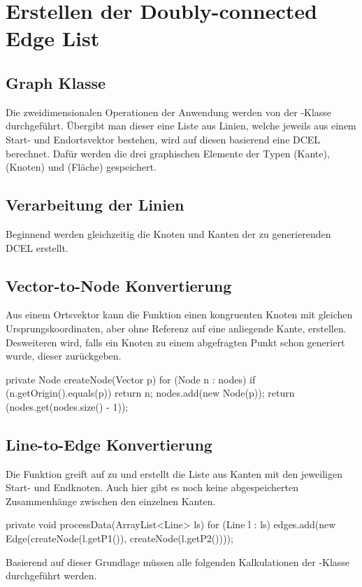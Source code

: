 \section{Erstellen der Doubly-connected Edge List}
\subsection{Graph Klasse}
Die zweidimensionalen Operationen der Anwendung werden von der -Klasse durchgeführt. 
Übergibt man dieser eine Liste aus Linien, welche jeweils aus einem Start- und Endortsvektor bestehen, wird auf diesen basierend eine DCEL berechnet.
Dafür werden die drei graphischen Elemente der Typen (Kante), (Knoten) und (Fläche) gespeichert.

\subsection{Verarbeitung der Linien}
Beginnend werden gleichzeitig die Knoten und Kanten der zu generierenden DCEL erstellt.
\subsection{Vector-to-Node Konvertierung}
Aus einem Ortsvektor kann die Funktion  einen kongruenten Knoten mit gleichen Ursprungskoordinaten, aber ohne Referenz auf eine anliegende Kante, erstellen. 
Desweiteren wird, falls ein Knoten zu einem abgefragten Punkt schon generiert wurde, dieser zurückgeben.
\begin{code}
	private Node createNode(Vector p) {
		for (Node n : nodes) {
			if (n.getOrigin().equals(p)) {
				return n;
			}
		}
		nodes.add(new Node(p));
		return (nodes.get(nodes.size() - 1));
	}
\end{code}
\subsection{Line-to-Edge Konvertierung}
\label{subsec:ltoe} 
Die  Funktion greift auf  zu und erstellt die Liste aus Kanten mit den jeweiligen Start- und Endknoten.
Auch hier gibt es noch keine abgespeicherten Zusammenhänge zwischen den einzelnen Kanten.
\begin{code}
private void processData(ArrayList<Line> ls) {
	for (Line l : ls) {
		edges.add(new Edge(createNode(l.getP1()), createNode(l.getP2())));
	}
}
\end{code}
Basierend auf dieser Grundlage müssen alle folgenden Kalkulationen der -Klasse durchgeführt werden.
